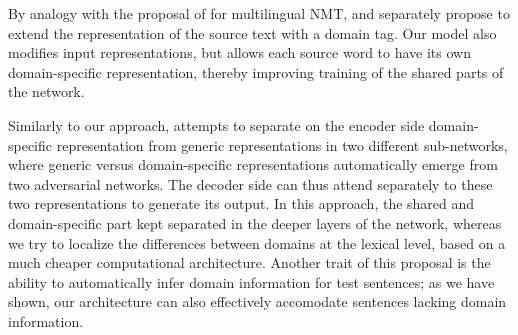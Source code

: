 \documentclass[11pt,a4paper]{article}
\newcommand{\fyTodo}[1]{\Todo[FY:]{\textcolor{orange}{#1}}}
\begin{document}
By analogy with the proposal of \citet{Johnson17google} for multilingual NMT, \citet{Kobus17domaincontrol} and \citet{Chu18multilingual} separately propose to extend the representation of the source text with a domain tag. Our model also modifies input representations, but allows each source word to have its own domain-specific representation, thereby improving training of the shared parts of the network.\fyTodo{Talk about target embeddings somewhere.} 

Similarly to our approach, \cite{Zeng18multidomain} attempts to separate on the encoder side domain-specific representation from generic representations in two different sub-networks, where generic versus domain-specific representations automatically emerge from two adversarial networks. The decoder side can thus attend separately to these two representations to generate its output. In this approach, the shared and domain-specific part kept separated in the deeper layers of the network, whereas we try to localize the differences between domains at the lexical level, based on a much cheaper computational architecture. Another trait of this proposal is the ability to automatically infer domain information for test sentences; as we have shown, our architecture can also effectively accomodate sentences lacking domain information.

\end{document}
